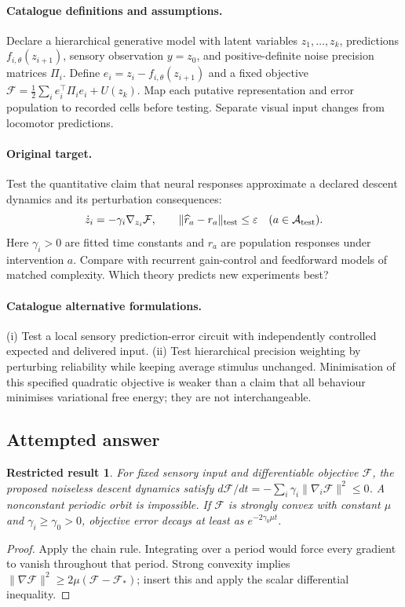 \documentclass[11pt]{article}
\newtheorem{attemptresult}{Restricted result}[section]
\begin{document}
\paragraph{Catalogue definitions and assumptions.}
Declare a hierarchical generative model with latent variables $z_1,\ldots,z_k$, predictions $f_{i,\theta}(z_{i+1})$, sensory observation $y=z_0$, and positive-definite noise precision matrices $\Pi_i$. Define $e_i=z_i-f_{i,\theta}(z_{i+1})$ and a fixed objective $\mathcal F=\tfrac12\sum_i e_i^\top\Pi_i e_i+U(z_k)$. Map each putative representation and error population to recorded cells before testing. Separate visual input changes from locomotor predictions.
\paragraph{Original target.}
Test the quantitative claim that neural responses approximate a declared descent dynamics and its perturbation consequences:
\[
\dot z_i=-\gamma_i\nabla_{z_i}\mathcal F,
\qquad
\|\widehat r_{a}-r_a\|_{\rm test}\leq\varepsilon
\quad(a\in\mathcal A_{\rm test}).
\]
Here $\gamma_i>0$ are fitted time constants and $r_a$ are population responses under intervention $a$. Compare with recurrent gain-control and feedforward models of matched complexity. Which theory predicts new experiments best?
\paragraph{Catalogue alternative formulations.}
(i) Test a local sensory prediction-error circuit with independently controlled expected and delivered input. (ii) Test hierarchical precision weighting by perturbing reliability while keeping average stimulus unchanged. Minimisation of this specified quadratic objective is weaker than a claim that all behaviour minimises variational free energy; they are not interchangeable.
\subsection{Attempted answer}
\begin{attemptresult}
For fixed sensory input and differentiable objective $\mathcal F$, the proposed noiseless descent dynamics satisfy $d\mathcal F/dt=-\sum_i\gamma_i\|\nabla_i\mathcal F\|^2\leq0$. A nonconstant periodic orbit is impossible. If $\mathcal F$ is strongly convex with constant $\mu$ and $\gamma_i\geq\gamma_0>0$, objective error decays at least as $e^{-2\gamma_0\mu t}$.
\end{attemptresult}
\begin{proof}
Apply the chain rule. Integrating over a period would force every gradient to vanish throughout that period. Strong convexity implies $\|\nabla\mathcal F\|^2\geq2\mu(\mathcal F-\mathcal F_*)$; insert this and apply the scalar differential inequality.
\end{proof}
\end{document}
